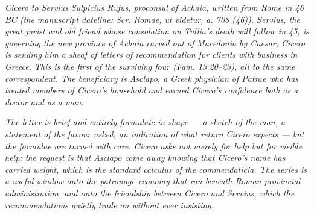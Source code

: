 
\textit{Cicero to Servius Sulpicius Rufus, proconsul of
Achaia, written from Rome in 46 BC (the manuscript
dateline: \textit{Scr. Romae, ut videtur, a. 708 (46)}).
Servius, the great jurist and old friend whose
consolation on Tullia's death will follow in 45, is
governing the new province of Achaia carved out of
Macedonia by Caesar; Cicero is sending him a sheaf of
letters of recommendation for clients with business in
Greece. This is the first of the surviving four (Fam.
13.20--23), all to the same correspondent. The
beneficiary is Asclapo, a Greek physician of Patrae who
has treated members of Cicero's household and earned
Cicero's confidence both as a doctor and as a man.}

\textit{The letter is brief and entirely formulaic in
shape --- a sketch of the man, a statement of the
favour asked, an indication of what return Cicero
expects --- but the formulae are turned with care.
Cicero asks not merely for help but for visible help:
the request is that Asclapo come away knowing that
Cicero's name has carried weight, which is the standard
calculus of the commendaticia. The series is a useful
window onto the patronage economy that ran beneath
Roman provincial administration, and onto the friendship
between Cicero and Servius, which the recommendations
quietly trade on without ever insisting.}
